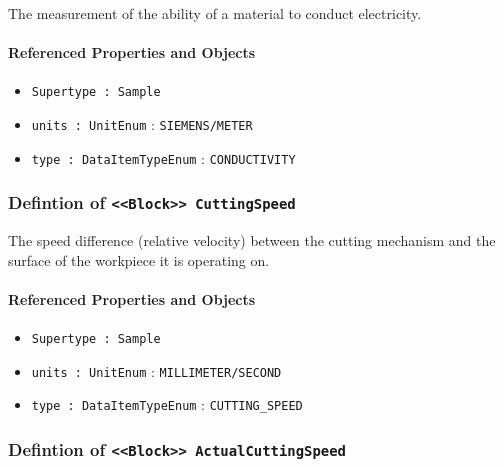 \FloatBarrier

The measurement of the ability of a material to conduct electricity.

\FloatBarrier
\paragraph{Referenced Properties and Objects}

\begin{itemize}
\item \texttt{Supertype : Sample}

\item \texttt{units : UnitEnum} : \texttt{SIEMENS/METER}

\item \texttt{type : DataItemTypeEnum} : \texttt{CONDUCTIVITY}

\end{itemize}
\FloatBarrier
\subsubsection{Defintion of \texttt{<<Block>> CuttingSpeed}}
  \label{type:CuttingSpeed}

\FloatBarrier

The speed difference (relative velocity) between the cutting mechanism and the surface of the workpiece it is operating on.

\FloatBarrier
\paragraph{Referenced Properties and Objects}

\begin{itemize}
\item \texttt{Supertype : Sample}

\item \texttt{units : UnitEnum} : \texttt{MILLIMETER/SECOND}

\item \texttt{type : DataItemTypeEnum} : \texttt{CUTTING_SPEED}

\end{itemize}
\FloatBarrier
\subsubsection{Defintion of \texttt{<<Block>> ActualCuttingSpeed}}
  \label{type:ActualCuttingSpeed}

\FloatBarrier

